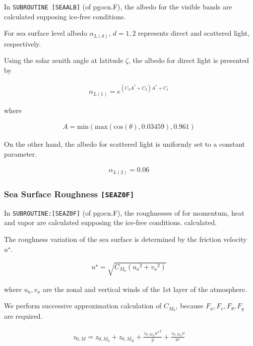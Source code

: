 \begin{itemize}
In \texttt{SUBROUTINE\ {[}SEAALB{]}} (of pgocn.F), the albedo for the
visible bands are calculated supposing ice-free conditions.

For sea surface level albedo \(\alpha_{L(d)}\), \(d=1,2\) represents
direct and scattered light, respectively.

Using the solar zenith angle at latitude \(\zeta\), the albedo for
direct light is presented by

\begin{eqnarray}
    \alpha_{L(1)} = e^{(C_3A^* + C_2) A^* +C_1}
\end{eqnarray}

where

\begin{eqnarray}
    A = \mathrm{min}(\mathrm{max}(\mathrm{cos}(\theta),0.03459),0.961)
\end{eqnarray}

On the other hand, the albedo for scattered light is uniformly set to a
constant parameter.

\begin{eqnarray}
    \alpha_{L(2)} = 0.06
\end{eqnarray}

\hypertarget{sea-surface-roughness-seaz0f}{%
\subsubsection{\texorpdfstring{Sea Surface Roughness
\texttt{{[}SEAZ0F{]}}}{Sea Surface Roughness {[}SEAZ0F{]}}}\label{sea-surface-roughness-seaz0f}}

In \texttt{SUBROUTINE:{[}SEAZ0F{]}} (of pgocn.F), the roughnesses of for
momentum, heat and vapor are calculated supposing the ice-free
conditions. calculated.

The roughness variation of the sea surface is determined by the friction
velocity \(u^\star\).

\begin{eqnarray}
u^{\star} = \sqrt{C_{M_0} ({u_a}^2  +{v_a}^2)}
\end{eqnarray}

where \(u_a,v_a\) are the zonal and vertical winds of the 1st layer of
the atmosphere.

We perform successive approximation calculation of \({C_{M_0}}\),
because \(F_u,F_v,F_\theta,F_q\) are required.

\begin{eqnarray}
    z_{0,M} = z_{0,M_0} + z_{0,M_R} + \frac{z_{0,M_R} {u^\star }^2 }{g} + \frac{z_{0,M_S}\nu }{u^\star}
\end{eqnarray}


\end{itemize}
